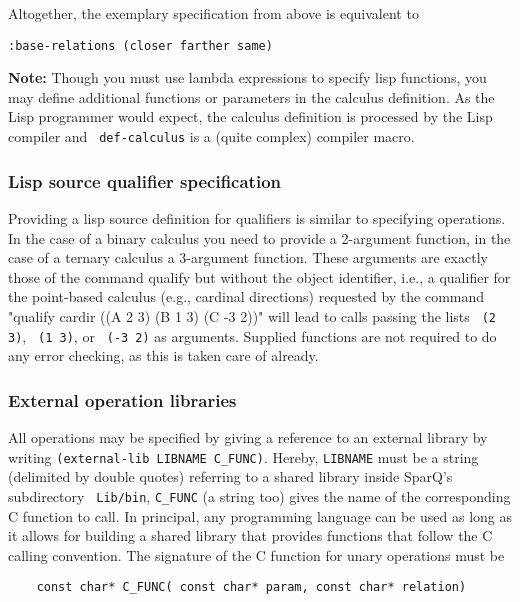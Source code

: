 \documentclass[headsepline]{scrreprt}
\theoremstyle{definition}
\newcommand{\engine}{SparQ}
\begin{document}
Altogether, the exemplary specification from above is equivalent to

\begin{verbatim}
:base-relations (closer farther same)
\end{verbatim}

{\bfseries Note:} Though you must use lambda expressions to specify lisp functions, you may define additional functions or parameters in the calculus definition. As the Lisp programmer would expect, the calculus definition is processed by the Lisp compiler and \texttt{ def-calculus} is a (quite complex) compiler macro.

\subsubsection{Lisp source qualifier specification}

Providing a lisp source definition for qualifiers is similar to specifying operations. In the case of a binary calculus you need to provide a 2-argument function, in the case of a ternary calculus a 3-argument function. These arguments are exactly those of the command qualify but without the object identifier, i.e., a qualifier for the point-based calculus (e.g., cardinal directions) requested by the command "qualify cardir ((A 2 3)  (B 1 3) (C -3 2))" will lead to calls passing the lists \texttt{ (2 3)}, \texttt{ (1 3)}, or \texttt{ (-3 2)} as arguments. Supplied functions are not required to do any error checking, as this is taken care of already.


\subsubsection{External operation libraries}

All operations may be specified by giving a reference to an external library by writing \verb=(external-lib LIBNAME C_FUNC)=. Hereby, \verb=LIBNAME= must be a string (delimited by double quotes) referring to a shared library inside \engine{}'s subdirectory \texttt{ Lib/bin}, \verb=C_FUNC= (a string too) gives the name of the corresponding C function to call. In principal, any programming language can be used as long as it allows for building a shared library that provides functions that follow the C calling convention. The signature of the C function for unary operations must be

\begin{verbatim}
	const char* C_FUNC( const char* param, const char* relation)
\end{verbatim}
\end{document}
